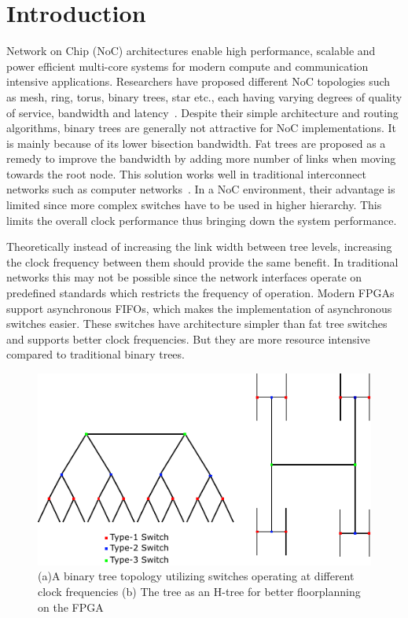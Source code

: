 \section{Introduction}
Network on Chip (NoC) architectures enable high performance, scalable and power efficient multi-core systems for modern compute and communication intensive applications.
Researchers have proposed different NoC topologies such as mesh, ring, torus, binary trees, star etc., each having varying degrees of quality of service, bandwidth and latency~\cite{Dally2003}.
Despite their simple architecture and routing algorithms, binary trees are generally not attractive for NoC implementations.
It is mainly because of its lower bisection bandwidth.
Fat trees are proposed as a remedy to improve the bandwidth by adding more number of links when moving towards the root node.
This solution works well in traditional interconnect networks such as computer networks~\cite{Shainer2011}.
In a NoC environment, their advantage is limited since more complex switches have to be used in higher hierarchy.
This limits the overall clock performance thus bringing down the system performance. 

Theoretically instead of increasing the link width between tree levels, increasing the clock frequency between them should provide the same benefit.
In traditional networks this may not be possible since the network interfaces operate on predefined standards which restricts the frequency of operation.
Modern FPGAs support asynchronous FIFOs, which makes the implementation of asynchronous switches easier.
These switches have architecture simpler than fat tree switches and supports better clock frequencies.
But they are more resource intensive compared to traditional binary trees.


\begin{figure}[t]
\centering
   \includegraphics[width=\columnwidth]{Figures/HNoC.pdf}
   \caption{(a)A binary tree topology utilizing switches operating at different clock frequencies (b) The tree as an H-tree for better floorplanning on the FPGA}
   \label{fig:btree}
\end{figure}

